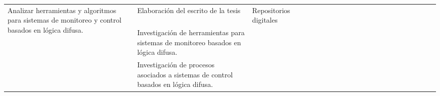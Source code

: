 \begin{landscape}
\begin{ThreePartTable}
\begin{longtable}{|p{}|p{5.5cm}|p{5.5cm}|l|l|l|l|l|l|l|l|l|l|l|l|l|l|l|l|l|l|l|}
      \hline
      \multirow{3}{0.28 \textwidth}{Analizar herramientas y algoritmos para sistemas de monitoreo y control basados en lógica difusa.}                                                         & Elaboración del escrito de la tesis                                                        & Repositorios digitales                                                                                           & \cellcolor{magenta!70}                & \cellcolor{magenta!70}                & \cellcolor{magenta!70}               & \cellcolor{magenta!70}                & \cellcolor{magenta!70} & \cellcolor{magenta!70} & \cellcolor{magenta!70} & \cellcolor{magenta!70} & \cellcolor{magenta!70} & \cellcolor{magenta!70} & \cellcolor{magenta!70} & \cellcolor{magenta!70} & \cellcolor{magenta!70} & \cellcolor{magenta!70} &                        \\
      \cline{2-2}\cline{4-21}
                                                                                                                                                                                               & Investigación de herramientas para sistemas de monitoreo basados en lógica difusa.         &                                                                                                                  & \cellcolor{magenta!70}                &                                       &                                      &                                       &                        &                        &                        &                        &                        &                        &                        &                        &                        &                        &                        \\
      \cline{2-2}\cline{4-21}
                                                                                                                                                                                               & Investigación de procesos asociados a sistemas de control basados en lógica difusa.        &                                                                                                                  & \cellcolor{magenta!70}                &                                       &                                      &                                       &                        &                        &                        &                        &                        &                        &                        &                        &                        &                        &                        \\

\end{longtable}
\end{ThreePartTable}
\end{landscape}
